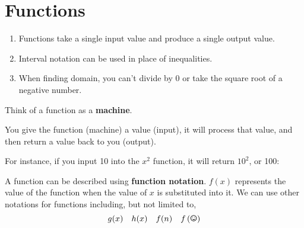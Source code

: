 \documentclass{article}
\begin{document}
\section*{Functions}

\begin{tcolorbox}[colframe=orange!70!white, coltitle=black, title=\textbf{Summary}]
\begin{enumerate}
    \item Functions take a single input value and produce a single output value.
    \item Interval notation can be used in place of inequalities.
    \item When finding domain, you can't divide by 0 or take the square root of a negative number.
\end{enumerate}
\end{tcolorbox}
\vspace{1in}

Think of a function as a \textbf{machine}. 
\vspace{0.5in}

You give the function (machine) a value (input), \newline 
it will process that value, and then return a value back to you (output).
\vspace{1in}

For instance, if you input 10 into the $x^2$ function, it will return $10^2$, or 100:	\newline\\

\begin{center}
\end{center}
\vfill 

A function can be described using \textbf{function notation}. 
\vfill 
$f(x)$ represents the value of the function when the value of $x$ is substituted into it.
\vfill 
We can use other notations for functions including, but not limited to,
\[ g(x) \quad h(x) \quad f(n) \quad f\left(\text{\Smiley}\right) \]
\vfill 
\end{document}
